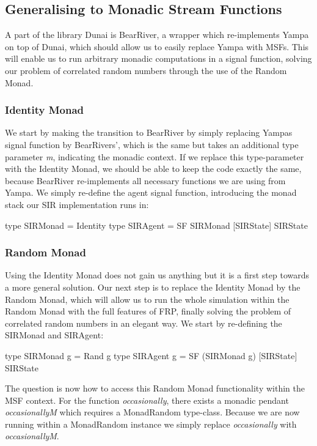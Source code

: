 \subsection{Generalising to Monadic Stream Functions}
\label{sec:generalising_msfs}
A part of the library Dunai is BearRiver, a wrapper which re-implements Yampa on top of Dunai, which should allow us to easily replace Yampa with MSFs. This will enable us to run arbitrary monadic computations in a signal function, solving our problem of correlated random numbers through the use of the Random Monad.

\subsubsection{Identity Monad}
We start by making the transition to BearRiver by simply replacing Yampas signal function by BearRivers', which is the same but takes an additional type parameter \textit{m}, indicating the monadic context. If we replace this type-parameter with the Identity Monad, we should be able to keep the code exactly the same, because BearRiver re-implements all necessary functions we are using from Yampa. We simply re-define the agent signal function, introducing the monad stack our SIR implementation runs in:

\begin{HaskellCode}
type SIRMonad = Identity
type SIRAgent = SF SIRMonad [SIRState] SIRState
\end{HaskellCode}

\subsubsection{Random Monad}
Using the Identity Monad does not gain us anything but it is a first step towards a more general solution. Our next step is to replace the Identity Monad by the Random Monad, which will allow us to run the whole simulation within the Random Monad with the full features of FRP, finally solving the problem of correlated random numbers in an elegant way. We start by re-defining the SIRMonad and SIRAgent:

\begin{HaskellCode}
type SIRMonad g = Rand g
type SIRAgent g = SF (SIRMonad g) [SIRState] SIRState
\end{HaskellCode}

The question is now how to access this Random Monad functionality within the MSF context. For the function \textit{occasionally}, there exists a monadic pendant \textit{occasionallyM} which requires a MonadRandom type-class. Because we are now running within a MonadRandom instance we simply replace \textit{occasionally} with \textit{occasionallyM}. 

